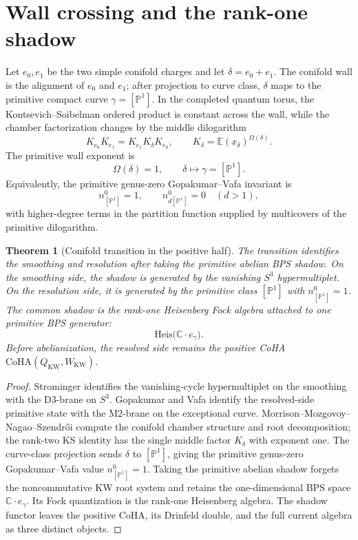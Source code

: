 \documentclass[11pt]{amsart}
\providecommand{\C}{\mathbb{C}}
\providecommand{\bP}{\mathbb{P}}
\providecommand{\CoHA}{\mathrm{CoHA}}
\providecommand{\Heis}{\mathrm{Heis}}
\theoremstyle{plain}
\newtheorem{theorem}{Theorem}[section]
\theoremstyle{definition}
\theoremstyle{remark}
\begin{document}
\section{Wall crossing and the rank-one shadow}

Let $e_0,e_1$ be the two simple conifold charges and let
\(\delta=e_0+e_1\).  The conifold wall is the alignment of
$e_0$ and $e_1$; after projection to curve class, $\delta$ maps to the
primitive compact curve $\gamma=[\bP^1]$.  In the completed quantum
torus, the Kontsevich--Soibelman ordered product is constant across the
wall, while the chamber factorization changes by the middle
dilogarithm
\[
  K_{e_0}K_{e_1}=K_{e_1}K_{\delta}K_{e_0},
  \qquad
  K_{\delta}=\mathbb{E}(x_{\delta})^{\Omega(\delta)}.
\]
The primitive wall exponent is
\[
  \Omega(\delta)=1,
  \qquad
  \delta\mapsto\gamma=[\bP^1].
\]
Equivalently, the primitive genus-zero Gopakumar--Vafa invariant is
\[
  n^0_{[\bP^1]}=1,\qquad n^0_{d[\bP^1]}=0\quad(d>1),
\]
with higher-degree terms in the partition function supplied by
multicovers of the primitive dilogarithm.

\begin{theorem}[Conifold transition in the positive half]
The transition identifies the smoothing and resolution after
taking the primitive abelian BPS shadow.  On the smoothing side, the
shadow is generated by the vanishing $S^3$ hypermultiplet.  On the
resolution side, it is generated by the primitive class $[\bP^1]$ with
$n^0_{[\bP^1]}=1$.  The common shadow is the rank-one Heisenberg Fock
algebra attached to one primitive BPS generator:
\[
  \Heis\bigl(\C\cdot e_\gamma\bigr).
\]
Before abelianization, the resolved side remains the positive CoHA
$\CoHA(Q_{\mathrm{KW}},W_{\mathrm{KW}})$.
\end{theorem}

\begin{proof}
Strominger identifies the vanishing-cycle hypermultiplet on the
smoothing with the D3-brane on $S^3$.  Gopakumar and Vafa identify the
resolved-side primitive state with the M2-brane on the exceptional
curve.  Morrison--Mozgovoy--Nagao--Szendr\H{o}i compute the conifold
chamber structure and root decomposition; the rank-two KS identity has
the single middle factor $K_\delta$ with exponent one.  The curve-class
projection sends $\delta$ to $[\bP^1]$, giving the primitive genus-zero
Gopakumar--Vafa value \(n^0_{[\bP^1]}=1\).  Taking the primitive
abelian shadow forgets the noncommutative KW root system and retains the
one-dimensional BPS space $\C\cdot e_\gamma$.  Its Fock quantization is
the rank-one Heisenberg algebra.  The shadow functor leaves the
positive CoHA, its Drinfeld double, and the full current algebra as
three distinct objects.
\end{proof}
\end{document}
